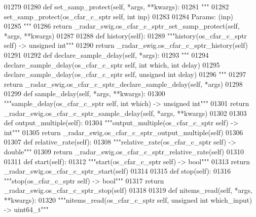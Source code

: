 \begin{DoxyCode}
{{{{{{01279 
01280     \textcolor{keyword}{def }set_samp_protect(self, *args, **kwargs):
01281         \textcolor{stringliteral}{"""}
01282 \textcolor{stringliteral}{        set\_samp\_protect(os\_cfar\_c\_sptr self, int inp)}
01283 \textcolor{stringliteral}{}
01284 \textcolor{stringliteral}{        Params: (inp)}
01285 \textcolor{stringliteral}{        """}
01286         \textcolor{keywordflow}{return} \_radar\_swig.os\_cfar\_c\_sptr\_set\_samp\_protect(self, *args, **kwargs)
01287 
01288     \textcolor{keyword}{def }history(self):
01289         \textcolor{stringliteral}{"""history(os\_cfar\_c\_sptr self) -> unsigned int"""}
01290         \textcolor{keywordflow}{return} \_radar\_swig.os\_cfar\_c\_sptr\_history(self)
01291 
01292     \textcolor{keyword}{def }declare_sample_delay(self, *args):
01293         \textcolor{stringliteral}{"""}
01294 \textcolor{stringliteral}{        declare\_sample\_delay(os\_cfar\_c\_sptr self, int which, int delay)}
01295 \textcolor{stringliteral}{        declare\_sample\_delay(os\_cfar\_c\_sptr self, unsigned int delay)}
01296 \textcolor{stringliteral}{        """}
01297         \textcolor{keywordflow}{return} \_radar\_swig.os\_cfar\_c\_sptr\_declare\_sample\_delay(self, *args)
01298 
01299     \textcolor{keyword}{def }sample_delay(self, *args, **kwargs):
01300         \textcolor{stringliteral}{"""sample\_delay(os\_cfar\_c\_sptr self, int which) -> unsigned int"""}
01301         \textcolor{keywordflow}{return} \_radar\_swig.os\_cfar\_c\_sptr\_sample\_delay(self, *args, **kwargs)
01302 
01303     \textcolor{keyword}{def }output_multiple(self):
01304         \textcolor{stringliteral}{"""output\_multiple(os\_cfar\_c\_sptr self) -> int"""}
01305         \textcolor{keywordflow}{return} \_radar\_swig.os\_cfar\_c\_sptr\_output\_multiple(self)
01306 
01307     \textcolor{keyword}{def }relative_rate(self):
01308         \textcolor{stringliteral}{"""relative\_rate(os\_cfar\_c\_sptr self) -> double"""}
01309         \textcolor{keywordflow}{return} \_radar\_swig.os\_cfar\_c\_sptr\_relative\_rate(self)
01310 
01311     \textcolor{keyword}{def }start(self):
01312         \textcolor{stringliteral}{"""start(os\_cfar\_c\_sptr self) -> bool"""}
01313         \textcolor{keywordflow}{return} \_radar\_swig.os\_cfar\_c\_sptr\_start(self)
01314 
01315     \textcolor{keyword}{def }stop(self):
01316         \textcolor{stringliteral}{"""stop(os\_cfar\_c\_sptr self) -> bool"""}
01317         \textcolor{keywordflow}{return} \_radar\_swig.os\_cfar\_c\_sptr\_stop(self)
01318 
01319     \textcolor{keyword}{def }nitems_read(self, *args, **kwargs):
01320         \textcolor{stringliteral}{"""nitems\_read(os\_cfar\_c\_sptr self, unsigned int which\_input) -> uint64\_t"""}
}}}}}}
\end{DoxyCode}
